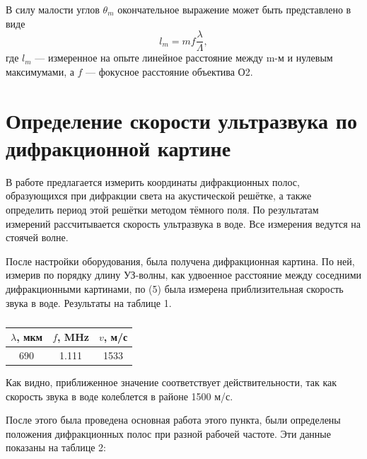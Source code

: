 \documentclass[a4paper, 14pt]{extarticle}%
\newcommand\ECaption[1]{%
     \captionsetup{font=footnotesize}%
     \caption{#1}}
\begin{document}
В  силу
малости углов $\theta_m$ окончательное выражение может быть представлено
в виде
\begin{equation}
l_m = mf\frac{\lambda}{\Lambda},
\end{equation}
где $l_m$ — измеренное на опыте линейное расстояние между m-м и нулевым максимумами, а $f$ — фокусное расстояние объектива О2.

\section{Определение скорости ультразвука по дифракционной картине}

В работе предлагается измерить координаты дифракционных полос, образующихся при дифракции света на акустической решётке, а
также определить период этой решётки методом тёмного поля. По результатам измерений рассчитывается скорость ультразвука в воде. Все
измерения ведутся на стоячей волне. 

После настройки оборудования, была получена дифракционная картина. По ней, измерив по порядку длину УЗ-волны, как удвоенное расстояние между соседними дифракционными картинами, по (5) была измерена приблизительная скорость звука в воде. Результаты на таблице 1.

\begin{table}[h!]
\begin{center}
\begin{tabular}{|c|c|c|}
\hline
\rowcolor[HTML]{9698ED} 
$\lambda$, мкм   & $f$, MHz      & $v$, м/с    \\ \hline
690 & 1.111 & 1533 \\ \hline
\end{tabular}
\ECaption{}
\end{center}
\end{table}

Как видно, приближенное значение соответствует действительности, так как скорость звука в воде колеблется в районе 1500 м/с. 

После этого была проведена основная работа этого пункта, были определены положения дифракционных полос при разной рабочей частоте. Эти данные показаны на таблице 2:
\end{document}
